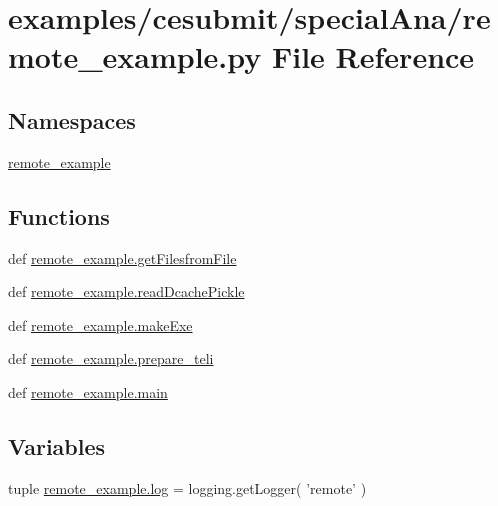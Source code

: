 \section{examples/cesubmit/special\-Ana/remote\-\_\-example.py File Reference}
\label{remote__example_8py}
\subsection*{Namespaces}
\begin{DoxyCompactItemize}
\item 
\hyperlink{namespaceremote__example}{remote\-\_\-example}
\end{DoxyCompactItemize}
\subsection*{Functions}
\begin{DoxyCompactItemize}
\item 
def \hyperlink{namespaceremote__example_adfad74177047d41af9192e0c27ca0f11}{remote\-\_\-example.\-get\-Filesfrom\-File}
\item 
def \hyperlink{namespaceremote__example_a941d9989cf514ed1a2743ce0769986b3}{remote\-\_\-example.\-read\-Dcache\-Pickle}
\item 
def \hyperlink{namespaceremote__example_aa366d81c2213be4f09448d8d9ec7d5a9}{remote\-\_\-example.\-make\-Exe}
\item 
def \hyperlink{namespaceremote__example_a5f1b70c11c7c72085662e209fda46281}{remote\-\_\-example.\-prepare\-\_\-teli}
\item 
def \hyperlink{namespaceremote__example_a60defb237b46b124774a856eaa8b011e}{remote\-\_\-example.\-main}
\end{DoxyCompactItemize}
\subsection*{Variables}
\begin{DoxyCompactItemize}
\item 
tuple \hyperlink{namespaceremote__example_aab9a9f276e437386b7e62b5a4c9def26}{remote\-\_\-example.\-log} = logging.\-get\-Logger( 'remote' )
\end{DoxyCompactItemize}
